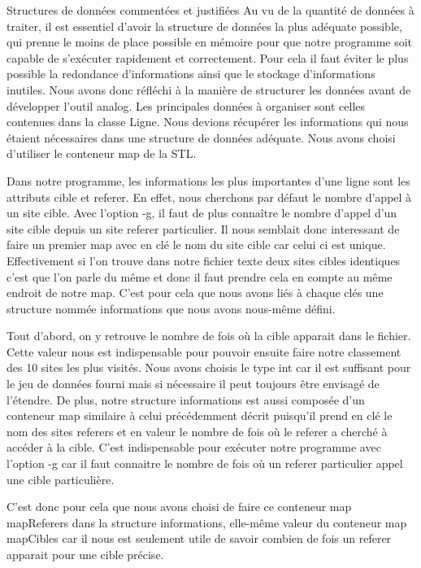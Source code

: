 \documentclass[11pt]{article}
\begin{document}
\begin{section}{Structures de données commentées et justifiées}
Au vu de la quantité de données à traiter, il est essentiel d'avoir la structure de données la plus adéquate possible, qui prenne le moins de place possible en mémoire pour que notre programme soit capable de s'exécuter rapidement et correctement. Pour cela il faut éviter le plus possible la redondance d'informations ainsi que le stockage d'informations inutiles.
Nous avons donc réfléchi à la manière de structurer les données avant de développer l'outil analog. Les principales données à organiser sont celles contenues dans la classe Ligne. Nous devions récupérer les informations qui nous étaient nécessaires dans une structure de données adéquate. Nous avons choisi d'utiliser le conteneur map de la STL.


Dans notre programme, les informations les plus importantes d'une ligne sont les attributs cible et referer. En effet, nous cherchons par défaut le nombre d'appel à un site cible. Avec l'option -g, il faut de plus connaître le nombre d'appel d'un site cible depuis un site referer particulier. Il nous semblait donc interessant de faire un premier map avec en clé le nom du site cible car celui ci est unique. Effectivement si l'on trouve dans notre fichier texte deux sites cibles identiques c'est que l'on parle du même et donc il faut prendre cela en compte au même endroit de notre map. C'est pour cela que nous avons liés à chaque clés une structure nommée informations que nous avons nous-même défini. 

Tout d'abord, on y retrouve le nombre de fois où la cible apparait dans le fichier. Cette valeur nous est indispensable pour pouvoir ensuite faire notre classement des 10 sites les plus visités. Nous avons choisis le type int car il est suffisant pour le jeu de données fourni mais si nécessaire il peut toujours être envisagé de l'étendre.
De plus, notre structure informations est aussi composée d'un conteneur map similaire à celui précédemment décrit puisqu'il prend en clé le nom des sites referers et en valeur le nombre de fois où le referer a cherché à accéder à la cible. C'est indispensable pour exécuter notre programme avec l'option -g car il faut connaitre le nombre de fois où un referer particulier appel une cible particulière.

C'est donc pour cela que nous avons choisi de faire ce conteneur map mapReferers dans la structure informations, elle-même valeur du conteneur map mapCibles car il nous est seulement utile de savoir combien de fois un referer apparait pour une cible précise.


\end{section}
\end{document}
